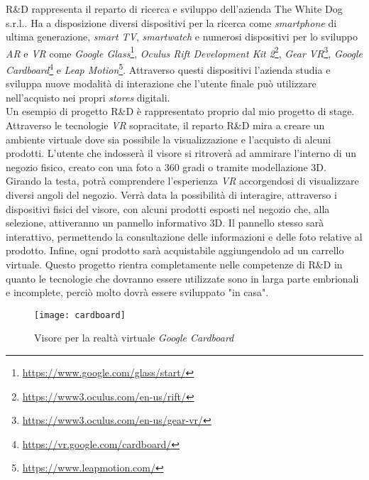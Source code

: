 R\&D rappresenta il reparto di ricerca e sviluppo dell'azienda The White Dog s.r.l..
Ha a disposizione diversi dispositivi per la ricerca come \textit{smartphone} di ultima generazione, \textit{smart TV}, \textit{smartwatch} e numerosi dispositivi per lo sviluppo \textit{AR} e \textit{VR} come \textit{Google Glass}\footnote[11]{\url{https://www.google.com/glass/start/}}, \textit{Oculus Rift Development Kit 2}\footnote[12]{\url{https://www3.oculus.com/en-us/rift/}}, \textit{Gear VR}\footnote[13]{\url{https://www3.oculus.com/en-us/gear-vr/}}, \textit{Google Cardboard}\footnote[14]{\url{https://vr.google.com/cardboard/}} e \textit{Leap Motion}\footnote[15]{\url{https://www.leapmotion.com/}}. Attraverso questi dispositivi l'azienda studia e sviluppa nuove modalità di interazione che l'utente finale può utilizzare nell'acquisto nei propri \textit{stores} digitali. \\
Un esempio di progetto R\&D è rappresentato proprio dal mio progetto di stage. Attraverso le tecnologie \textit{VR} sopracitate, il reparto R\&D mira a creare un ambiente virtuale dove sia possibile la visualizzazione e l'acquisto di alcuni prodotti. L'utente che indosserà il visore si ritroverà ad ammirare l'interno di un negozio fisico, creato con una foto a 360 gradi o tramite modellazione 3D. Girando la testa, potrà comprendere l'esperienza \textit{VR} accorgendosi di visualizzare diversi angoli del negozio. Verrà data la possibilità di interagire, attraverso i dispositivi fisici del visore, con alcuni prodotti esposti nel negozio che, alla selezione, attiveranno un pannello informativo 3D. Il pannello stesso sarà interattivo, permettendo la consultazione delle informazioni e delle foto relative al prodotto. Infine, ogni prodotto sarà acquistabile aggiungendolo ad un carrello virtuale.
Questo progetto rientra completamente nelle competenze di R\&D in quanto le tecnologie che dovranno essere utilizzate sono in larga parte embrionali e incomplete, perciò molto dovrà essere sviluppato "in casa".

\label{Google Cardboard}
\begin{figure}[ht]
	\begin{center}
		\texttt{[image: cardboard]}
		\caption{Visore per la realtà virtuale \textit{Google Cardboard}}
	\end{center}
\end{figure}
\FloatBarrier